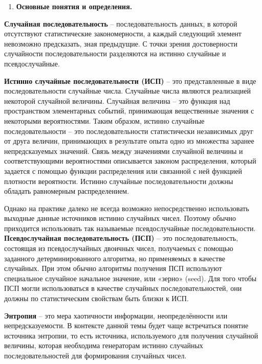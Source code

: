 \clearpage
{}

\begin{enumerate}
\def\labelenumi{\arabic{enumi}.}
\item
  \textbf{Основные понятия и определения.}
\end{enumerate}

\textbf{Случайная последовательность} -- последовательность данных, в
которой отсутствуют статистические закономерности, а каждый следующий
элемент невозможно предсказать, зная предыдущие. С точки зрения
достоверности случайности последовательности разделяются на истинно
случайные и псевдослучайные.

\textbf{Истинно случайные последовательности (ИСП)} -- это
представленные в виде последовательности случайные числа. Случайные
числа являются реализацией некоторой случайной величины. Случайная
величина -- это функция над пространством элементарных событий,
принимающая вещественные значения с некоторыми вероятностями. Таким
образом, истинно случайные последовательности -- это последовательности
статистически независимых друг от друга величин, принимающих в
результате опыта одно из множества заранее непредсказуемых значений.
Связь между значениями случайной величины и соответствующими
вероятностями описывается законом распределения, который задается с
помощью функции распределения или связанной с ней функцией плотности
вероятности. Истинно случайные последовательности должны обладать
равномерным распределением.

Однако на практике далеко не всегда возможно непосредственно
использовать выходные данные источников истинно случайных чисел. Поэтому
обычно приходится использовать так называемые псевдослучайные
последовательности. \textbf{Псевдослучайная последовательность (ПСП)} --
это последовательность, состоящая из псевдослучайных двоичных чисел,
получаемых с помощью заданного детерминированного алгоритма, но
применяемых в качестве случайных. При этом обычно алгоритмы получения
ПСП используют специальное случайное начальное значение, или «зерно»
(seed). Для того чтобы ПСП могли использоваться в качестве случайных
последовательностей, они должны по статистическим свойствам быть близки
к ИСП.

\textbf{Энтропия} -- это мера хаотичности информации, неопределённости
или непредсказуемости. В контексте данной темы будет чаще встречаться
понятие источника энтропии, то есть источника, используемого для
получения случайной величины, которая необходима генераторам истинно
случайных последовательностей для формирования случайных чисел.

